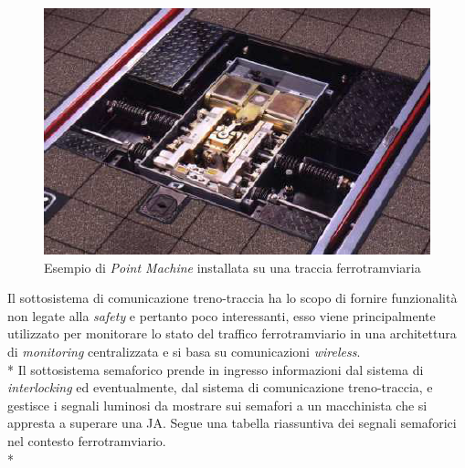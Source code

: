 \begin{itemize}
\begin{figure}[h]
		\centering
		\includegraphics[width=0.7\linewidth]{img/pointmachine}
		\caption{Esempio di \emph{Point Machine} installata su una traccia ferrotramviaria}
		\label{fig:pointmachine}
	\end{figure}
\end{itemize}
Il sottosistema di comunicazione treno-traccia ha lo scopo di fornire funzionalit\`a non legate alla \emph{safety} e pertanto poco interessanti, esso viene principalmente utilizzato per monitorare lo stato del traffico ferrotramviario in una architettura di \emph{monitoring} centralizzata e si basa su comunicazioni \emph{wireless}.\\*
Il sottosistema semaforico prende in ingresso informazioni dal sistema di \emph{interlocking} ed eventualmente, dal sistema di comunicazione treno-traccia, e gestisce i segnali luminosi da mostrare sui semafori a un macchinista che si appresta a superare una JA. Segue una tabella riassuntiva dei segnali semaforici nel contesto ferrotramviario.\\*
